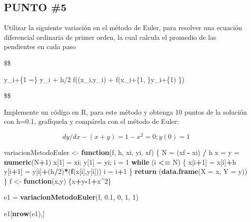 \documentclass[]{article}
\newenvironment{Shaded}{\begin{snugshade}}{\end{snugshade}}
\newcommand{\KeywordTok}[1]{\textcolor[rgb]{0.13,0.29,0.53}{\textbf{#1}}}
\newcommand{\DataTypeTok}[1]{\textcolor[rgb]{0.13,0.29,0.53}{#1}}
\newcommand{\DecValTok}[1]{\textcolor[rgb]{0.00,0.00,0.81}{#1}}
\newcommand{\FloatTok}[1]{\textcolor[rgb]{0.00,0.00,0.81}{#1}}
\newcommand{\StringTok}[1]{\textcolor[rgb]{0.31,0.60,0.02}{#1}}
\newcommand{\ControlFlowTok}[1]{\textcolor[rgb]{0.13,0.29,0.53}{\textbf{#1}}}
\newcommand{\OperatorTok}[1]{\textcolor[rgb]{0.81,0.36,0.00}{\textbf{#1}}}
\newcommand{\NormalTok}[1]{#1}
\begin{document}
\subsection{PUNTO \#5}\label{punto-5}

Utilizar la siguiente variación en el método de Euler, para resolver una
ecuación diferencial ordinaria de primer orden, la cual calcula el
promedio de las pendientes en cada paso

\$\$

y\_i+\{1 =\} y\_i + h/2 f((x\_i,y\_i) + f(x\_i+\{1, \}y\_i+\{1) \})

\$\$

Implemente un código en R, para este método y obtenga 10 puntos de la
solución con h=0.1, grafíquela y compárela con el método de Euler:

\[
    dy/dx - (x+y) = 1 - x^2 =0 ; y(0) =1 
\]

\begin{Shaded}
\begin{Highlighting}[]
\NormalTok{variacionMetodoEuler <-}\StringTok{ }\ControlFlowTok{function}\NormalTok{(f, h, xi, yi, xf)}
\NormalTok{\{}
\NormalTok{  N =}\StringTok{ }\NormalTok{(xf }\OperatorTok{-}\StringTok{ }\NormalTok{xi) }\OperatorTok{/}\StringTok{ }\NormalTok{h}
\NormalTok{  x =}\StringTok{ }\NormalTok{y =}\StringTok{ }\KeywordTok{numeric}\NormalTok{(N}\OperatorTok{+}\DecValTok{1}\NormalTok{)}
\NormalTok{  x[}\DecValTok{1}\NormalTok{] =}\StringTok{ }\NormalTok{xi; }
\NormalTok{  y[}\DecValTok{1}\NormalTok{] =}\StringTok{ }\NormalTok{yi;}
\NormalTok{  i =}\StringTok{ }\DecValTok{1}
  \ControlFlowTok{while}\NormalTok{ (i }\OperatorTok{<=}\StringTok{ }\NormalTok{N)}
\NormalTok{  \{}
\NormalTok{    x[i}\OperatorTok{+}\DecValTok{1}\NormalTok{] =}\StringTok{ }\NormalTok{x[i]}\OperatorTok{+}\NormalTok{h}
\NormalTok{    y[i}\OperatorTok{+}\DecValTok{1}\NormalTok{] =}\StringTok{ }\NormalTok{y[i]}\OperatorTok{+}\NormalTok{(h}\OperatorTok{/}\DecValTok{2}\NormalTok{)}\OperatorTok{*}\NormalTok{(}\KeywordTok{f}\NormalTok{(x[i],y[i]))}
\NormalTok{    i =}\StringTok{ }\NormalTok{i}\OperatorTok{+}\DecValTok{1}
\NormalTok{  \}}
  \KeywordTok{return}\NormalTok{ (}\KeywordTok{data.frame}\NormalTok{(}\DataTypeTok{X =}\NormalTok{ x, }\DataTypeTok{Y =}\NormalTok{ y))}
\NormalTok{\}}
\NormalTok{f <-}\StringTok{ }\ControlFlowTok{function}\NormalTok{(x,y) \{x}\OperatorTok{+}\NormalTok{y}\OperatorTok{-}\DecValTok{1}\OperatorTok{+}\NormalTok{x}\OperatorTok{^}\DecValTok{2}\NormalTok{\}}

\NormalTok{e1 =}\StringTok{ }\KeywordTok{variacionMetodoEuler}\NormalTok{(f, }\FloatTok{0.1}\NormalTok{, }\DecValTok{0}\NormalTok{, }\DecValTok{1}\NormalTok{, }\DecValTok{1}\NormalTok{)}

\NormalTok{e1[}\KeywordTok{nrow}\NormalTok{(e1),]}
\end{Highlighting}
\end{Shaded}
\end{document}
